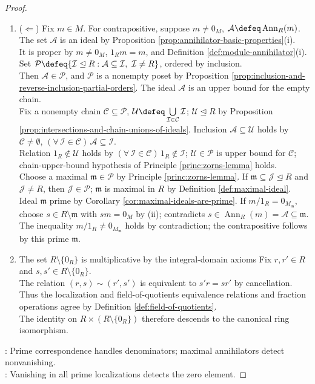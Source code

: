 \begin{proposition}
\begin{proof}
\begin{enumerate}[label=(\roman*)]
\item[$(iii)$] ($\Leftarrow$) Fix $m\in M$. For contrapositive, suppose $m\neq0_M$, $\mathcal{A}\defeq\operatorname{Ann}_R(m)$. The set $\mathcal{A}$ is an ideal by Proposition \ref{prop:annihilator-basic-properties}(i).\\
It is proper by $m\neq0_M$, $1_Rm=m$, and Definition \ref{def:module-annihilator}(i). Set $\mathcal{P}\defeq\{\mathcal{I}\trianglelefteq R:\mathcal{A}\subseteq\mathcal{I},\ \mathcal{I}\neq R\}$, ordered by inclusion.\\
Then $\mathcal{A}\in\mathcal{P}$, and $\mathcal{P}$ is a nonempty poset by Proposition \ref{prop:inclusion-and-reverse-inclusion-partial-orders}. The ideal $\mathcal{A}$ is an upper bound for the empty chain.\\
Fix a nonempty chain $\mathcal{C}\subseteq\mathcal{P}$, $\mathcal{U}\defeq\bigcup\limits_{\mathcal{I}\in\mathcal{C}}\mathcal{I}$; $\mathcal{U}\trianglelefteq R$ by Proposition \ref{prop:intersections-and-chain-unions-of-ideals}. Inclusion $\mathcal{A}\subseteq\mathcal{U}$ holds by $\mathcal{C}\neq\emptyset$, $(\forall\,\mathcal{I}\in\mathcal{C})\,\mathcal{A}\subseteq\mathcal{I}$.\\
Relation $1_R\notin\mathcal{U}$ holds by $(\forall\,\mathcal{I}\in\mathcal{C})\,1_R\notin\mathcal{I}$; $\mathcal{U}\in\mathcal{P}$ is upper bound for $\mathcal{C}$; chain-upper-bound hypothesis of Principle \ref{princ:zorns-lemma} holds.\\
Choose a maximal $\mathfrak{m}\in\mathcal{P}$ by Principle \ref{princ:zorns-lemma}. If $\mathfrak{m}\subseteq\mathcal{J}\trianglelefteq R$ and $\mathcal{J}\neq R$, then $\mathcal{J}\in\mathcal{P}$; $\mathfrak{m}$ is maximal in $R$ by Definition \ref{def:maximal-ideal}.\\
Ideal $\mathfrak{m}$ prime by Corollary \ref{cor:maximal-ideals-are-prime}. If $m/1_R=0_{M_{\mathfrak{m}}}$, choose $s\in R\setminus\mathfrak{m}$ with $sm=0_M$ by (ii); contradicts $s\in\operatorname{Ann}_R(m)=\mathcal{A}\subseteq\mathfrak{m}$.\\
The inequality $m/1_R\neq0_{M_{\mathfrak{m}}}$ holds by contradiction; the contrapositive follows by this prime $\mathfrak{m}$.
\item[$(iv)$] The set $R\setminus\{0_R\}$ is multiplicative by the integral-domain axioms Fix $r,r'\in R$ and $s,s'\in R\setminus\{0_R\}$.\\
The relation $(r,s)\sim(r',s')$ is equivalent to $s'r=sr'$ by cancellation.\\
Thus the localization and field-of-quotients equivalence relations and fraction operations agree by Definition \ref{def:field-of-quotients}.\\
The identity on $R\times(R\setminus\{0_R\})$ therefore descends to the canonical ring isomorphism.
\end{enumerate}
: Prime correspondence handles denominators; maximal annihilators detect nonvanishing.\\
: Vanishing in all prime localizations detects the zero element.
\end{proof}
\end{proposition}

